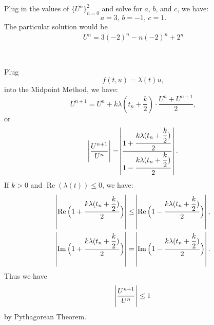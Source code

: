 \documentclass[11pt]{article}
\begin{document}
\subsection{}
Plug in the values of $\{U^n\}_{n=0}^2$ and solve for $a$, $b$, and $c$, we have:
\begin{equation}
    a=3,\,b=-1,\,c=1.
\nonumber\end{equation} 
The particular solution would be
\begin{equation}\begin{split}
    U^n = 3(-2)^n -n (-2)^n +2^n\\
\end{split}\end{equation} 

\pagebreak
\section{}

\pagebreak
\section{}
\subsection{}

\subsection{}

\subsection{}
Plug
\begin{equation}
    f(t, u) = \lambda(t)u,
\nonumber\end{equation}
into the Midpoint Method, we have:
\begin{equation}
    U^{n+1} = U^n + k\lambda(t_n + \dfrac k2)\cdot\dfrac{U^n+U^{n+1}}2,
\nonumber\end{equation}
or
\begin{equation}
    \abs{\dfrac{U^{n+1}}{U^n}} =
    \abs{\dfrac{1+\dfrac{k\lambda(t_n+\dfrac k2)}2}{1-\dfrac{k\lambda(t_n+\dfrac k2)}2}}.
\end{equation}
If $k>0$ and $\operatorname{Re}(\lambda(t)) \leq 0$, we have:
\begin{equation}\begin{split}
    \abs{\operatorname{Re}\Big(1+\dfrac{k\lambda(t_n+\dfrac k2)}2\Big)}
    &\leq\abs{\operatorname{Re}\Big(1-\dfrac{k\lambda(t_n+\dfrac k2)}2\Big)},\\
    \abs{\operatorname{Im}\Big(1+\dfrac{k\lambda(t_n+\dfrac k2)}2\Big)}
    &=\abs{\operatorname{Im}\Big(1-\dfrac{k\lambda(t_n+\dfrac k2)}2\Big)}.
\end{split}\end{equation}
Thus we have
\begin{equation}
    \abs{\dfrac{U^{n+1}}{U^n}} \leq 1
\end{equation}
by Pythagorean Theorem.
\end{document}
